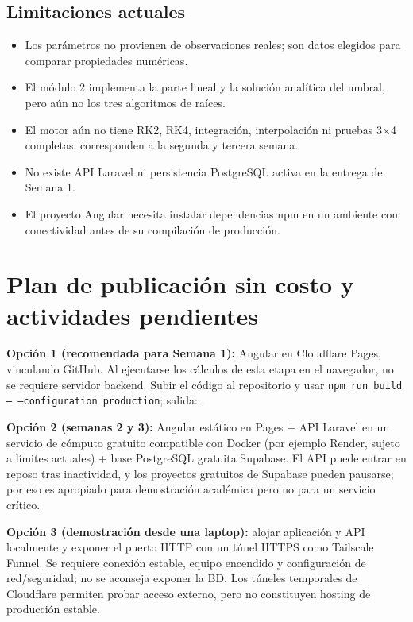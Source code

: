 \documentclass[letterpaper,11pt]{article}
\begin{document}
\subsection{Limitaciones actuales}
\begin{itemize}
\item Los parámetros no provienen de observaciones reales; son datos elegidos para comparar propiedades numéricas.
\item El módulo 2 implementa la parte lineal y la solución analítica del umbral, pero aún no los tres algoritmos de raíces.
\item El motor aún no tiene RK2, RK4, integración, interpolación ni pruebas 3$\times$4 completas: corresponden a la segunda y tercera semana.
\item No existe API Laravel ni persistencia PostgreSQL activa en la entrega de Semana 1.
\item El proyecto Angular necesita instalar dependencias npm en un ambiente con conectividad antes de su compilación de producción.
\end{itemize}

\section{Plan de publicación sin costo y actividades pendientes}
\textbf{Opción 1 (recomendada para Semana 1):} Angular en Cloudflare Pages, vinculando GitHub. Al ejecutarse los cálculos de esta etapa en el navegador, no se requiere servidor backend. Subir el código al repositorio y usar \texttt{npm run build -- --configuration production}; salida: .

\textbf{Opción 2 (semanas 2 y 3):} Angular estático en Pages + API Laravel en un servicio de cómputo gratuito compatible con Docker (por ejemplo Render, sujeto a límites actuales) + base PostgreSQL gratuita Supabase. El API puede entrar en reposo tras inactividad, y los proyectos gratuitos de Supabase pueden pausarse; por eso es apropiado para demostración académica pero no para un servicio crítico.

\textbf{Opción 3 (demostración desde una laptop):} alojar aplicación y API localmente y exponer el puerto HTTP con un túnel HTTPS como Tailscale Funnel. Se requiere conexión estable, equipo encendido y configuración de red/seguridad; no se aconseja exponer la BD. Los túneles temporales de Cloudflare permiten probar acceso externo, pero no constituyen hosting de producción estable.
\end{document}
